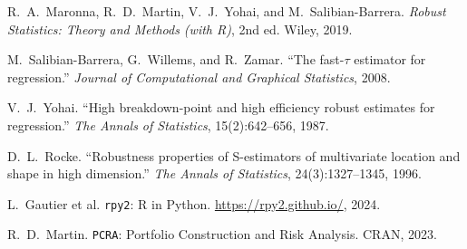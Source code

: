 \documentclass[11pt, a4paper]{article}
\begin{document}
\begin{enumerate}[leftmargin=2em, itemsep=3pt, label={[\arabic*]}]
  \item R.~A.~Maronna, R.~D.~Martin, V.~J.~Yohai, and
    M.~Salibian-Barrera.
    \textit{Robust Statistics: Theory and Methods (with R)}, 2nd ed.
    Wiley, 2019.
  \item M.~Salibian-Barrera, G.~Willems, and R.~Zamar.
    ``The fast-$\tau$ estimator for regression.''
    \textit{Journal of Computational and Graphical Statistics}, 2008.
  \item V.~J.~Yohai.
    ``High breakdown-point and high efficiency robust estimates for
    regression.''
    \textit{The Annals of Statistics}, 15(2):642--656, 1987.
  \item D.~L.~Rocke.
    ``Robustness properties of S-estimators of multivariate location and
    shape in high dimension.''
    \textit{The Annals of Statistics}, 24(3):1327--1345, 1996.
  \item L.~Gautier et al.
    \texttt{rpy2}: R in Python.
    \url{https://rpy2.github.io/}, 2024.
  \item R.~D.~Martin.
    \texttt{PCRA}: Portfolio Construction and Risk Analysis.
    CRAN, 2023.
\end{enumerate}
\end{document}
